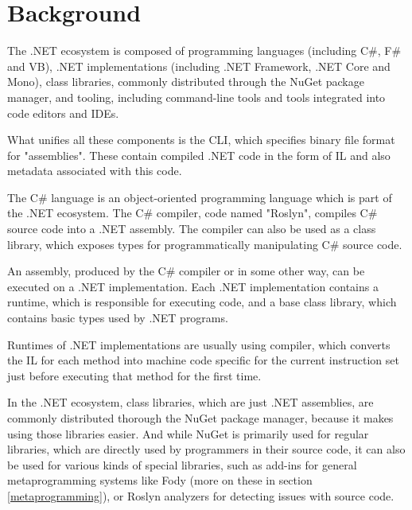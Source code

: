 \chapter{Background}
\label{background}

The .NET ecosystem is composed of programming languages (including C\#, F\# and \acl{VB}), \cite{tour} .NET implementations (including .NET Framework, .NET Core and Mono), \cite{implementations} class libraries, commonly distributed through the NuGet package manager, and tooling, including command-line tools and tools integrated into code editors and \acp{IDE}.

What unifies all these components is the \ac{CLI}, \cite{ecma-335} which specifies binary file format for "assemblies". These contain compiled .NET code in the form of \ac{IL} and also metadata associated with this code.

\medskip

The C\# language \cite{csharp-spec} is an object-oriented programming language which is part of the .NET ecosystem.
The C\# compiler, code named "Roslyn", \cite{roslyn} compiles C\# source code into a .NET assembly. The compiler can also be used as a class library, which exposes types for programmatically manipulating C\# source code.

\medskip

An assembly, produced by the C\# compiler or in some other way, can be executed on a .NET implementation. Each .NET implementation contains a runtime, which is responsible for executing code, and a base class library, which contains basic types used by .NET programs.

Runtimes of .NET implementations are usually using  compiler, which converts the \ac{IL} for each method into machine code specific for the current instruction set just before executing that method for the first time. %

\medskip

In the .NET ecosystem, class libraries, which are just .NET assemblies, are commonly distributed thorough the NuGet package manager, \cite{nuget} because it makes using those libraries easier.
And while NuGet is primarily used for regular libraries, which are directly used by programmers in their source code, it can also be used for various kinds of special libraries, such as add-ins for general metaprogramming systems like Fody (more on these in section \ref{metaprogramming}), or Roslyn analyzers for detecting issues with source code.

